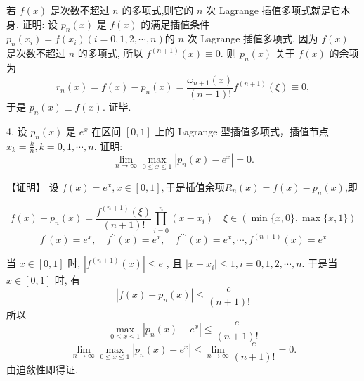 \begin{tcolorbox}
\begin{tcolorbox}[title=补充一个推论（可直接用于上面的证明中）]
   若 $ f(x) $ 是次数不超过 $ n $ 的多项式,则它的 $ n $ 次 Lagrange 插值多项式就是它本身.
\tcblower
证明: 设 $ p_{n}(x) $ 是 $ f(x) $ 的满足插值条件 $ p_{n}\left(x_{i}\right)=f\left(x_{i}\right)(i=0,1,2, \cdots, n) $的 $ n $ 次 Lagrange 插值多项式. 因为 $ f(x) $ 是次数不超过 $ n $ 的多项式, 所以 $ f^{(n+1)}(x) \equiv 0 $.
则 $ p_{n}(x) $ 关于 $ f(x) $ 的余项为
$$
r_{n}(x)=f(x)-p_{n}(x)=\frac{\omega_{n+1}(x)}{(n+1) !} f^{(n+1)}(\xi) \equiv 0,
$$
于是 $ p_{n}(x) \equiv f(x) $. 证毕.
\end{tcolorbox}

\end{tcolorbox}




\begin{tcolorbox}[breakable,enhanced,arc=0mm,outer arc=0mm,
		boxrule=0pt,toprule=1pt,leftrule=0pt,bottomrule=1pt, rightrule=0pt,left=0.2cm,right=0.2cm,
		titlerule=0.5em,toptitle=0.1cm,bottomtitle=-0.1cm,top=0.2cm,
		colframe=white!10!biru,colback=white!90!biru,coltitle=white,
            coltext=black,title =2024-03-10, title style={white!10!biru}, before skip=8pt, after skip=8pt,before upper=\hspace{2em},
		fonttitle=\bfseries,fontupper=\normalsize]
  
  4. 设 $ p_{n}(x) $ 是 $ e^{x} $ 在区间 $ [0,1] $ 上的 Lagrange 型插值多项式，插值节点 $ x_{k}=\frac{k}{n}, k=0,1, \cdots, n $. 证明:
$$
\lim _{n \rightarrow \infty} \max _{0 \leqslant x \leqslant 1}\left|p_{n}(x)-e^{x}\right|=0 .
$$

 \tcblower
【证明】 设 $ f(x)=e^x, x \in[0,1],$于是插值余项$R_n(x)=f(x)-p_{n}(x)$,即

$$ f(x)-p_{n}(x)=\frac{f^{(n+1)}(\xi)}{(n+1) !} \prod_{i=0}^{n}\left(x-x_{i}\right) \quad \xi \in(\min \{x, 0\}, \max \{x, 1\}) $$
$$
f^{\prime}(x)=e^x, \quad f^{\prime \prime}(x)=e^x ,\quad f^{\prime \prime \prime}(x)=e^x, \cdots, f^{(n+1)}(x)=e^x
$$

当 $ x \in[0,1] $ 时, $ \left|f^{(n+1)}(x)\right| \leqslant e $ ,
且 $ \left|x-x_{i}\right| \leqslant 1, i=0,1,2, \cdots, n $.
于是当 $ x \in[0,1] $ 时, 有
$$
\left|f(x)-p_{n}(x)\right| \leqslant \frac{e}{(n+1) !}
$$
所以
$$
\max _{0 \leqslant x \leqslant 1}\left|p_n(x)-e^x\right| \leqslant \frac{e}{(n+1) !}
$$
$$
\lim _{n \rightarrow \infty} \max _{0 \leqslant x \leqslant 1}\left|p_n(x)-e^x\right| \leqslant \lim _{n \rightarrow \infty} \frac{e}{(n+1) !}=0 .
$$
由迫敛性即得证.
\end{tcolorbox}


